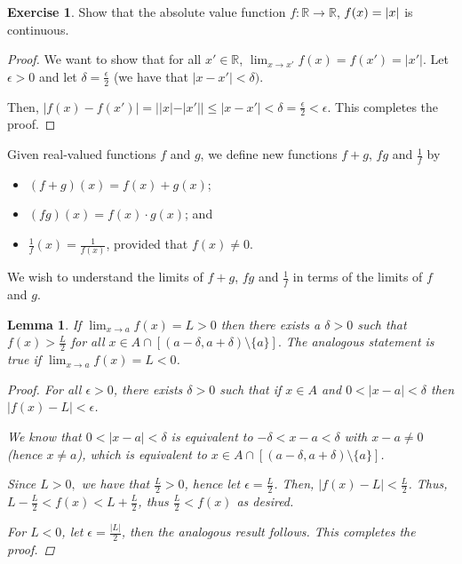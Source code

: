 \documentclass[11pt]{article}
\newcommand{\bbR}{\mathbb{R}}
\renewcommand{\_}[1]{\underline{ #1 }}
\DeclarePairedDelimiter{\abs}{\lvert}{\rvert}
\newtheorem{lemma}[theorem]{Lemma}
\theoremstyle{definition}
\newtheorem{exercise}[theorem]{Exercise}
\numberwithin{equation}{subsection}
\begin{document}
\begin{exercise}
	Show that the absolute value function $f\colon \bbR \to \bbR$, $f(x) = \abs{x}$ is continuous.
    
\begin{proof}
We want to show that for all $x'\in \bbR$, $\lim_{x \to x'} f(x) = f(x')=|x'|$. Let $\epsilon>0$ and let $\delta = \frac{\epsilon}{2}$ (we have that $|x-x'|<\delta)$. 

Then, $|f(x)-f(x')|=||x|-|x'||\leq |x-x'|<\delta=\frac{\epsilon}{2}<\epsilon$. This completes the proof.

\renewcommand\qedsymbol{QED}
\end{proof}


\end{exercise}

Given real-valued functions $f$ and $g$, we define new functions $f + g$, $fg$ and $\frac{1}{f}$ by
\begin{itemize}
	\item $(f + g)(x) = f(x) + g(x)$;
	\item $(f g)(x) = f(x) \cdot g(x)$; and
	\item $\frac{1}{f}(x) = \frac{1}{f(x)}$, provided that $f(x) \neq 0$.
\end{itemize}
We wish to understand the limits of $f + g$, $fg$ and $\frac{1}{f}$ in terms of the limits of $f$ and $g$. 


\begin{lemma} \label{lemma10.7}
 If $\displaystyle \lim_{x\to a} f(x)=L>0$ then there exists a $\delta>0$ such that $f(x)>\frac{L}{2}$ for all
$x\in A \cap [(a-\delta,a+\delta)\setminus\{a\}].$  The analogous statement is true if $\displaystyle \lim_{x\to a} f(x)=L< 0$. 
    
\begin{proof}
For all $\epsilon>0$, there exists $\delta>0$ such that if $x\in A$ and $0<|x-a|<\delta$ then $|f(x)-L|<\epsilon$.

We know that $0<|x-a|<\delta$ is equivalent to $-\delta<x-a<\delta$ with $x-a \neq 0$ (hence $x\neq a$), which is equivalent to $x \in A \cap [(a-\delta,a+\delta)\setminus\{a\}]$. 

Since $L>0,$ we have that $\frac{L}{2}>0$, hence let $\epsilon=\frac{L}{2}$. Then, $|f(x)-L|<\frac{L}{2}$. Thus, $L-\frac{L}{2}<f(x)<L+\frac{L}{2}$, thus $\frac{L}{2}<f(x)$ as desired. 

For $L<0$, let $\epsilon = \frac{|L|}{2}$, then the analogous result follows. This completes the proof.

\renewcommand\qedsymbol{QED}
\end{proof}


\end{lemma}
\end{document}
